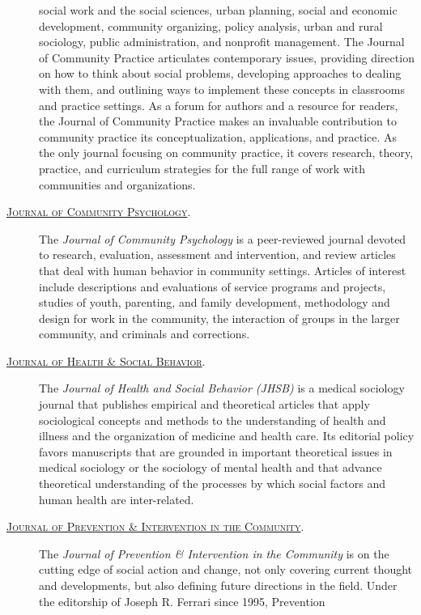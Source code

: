 \documentclass[]{tufte-handout}
\begin{document}
\begin{description}
social work and the social sciences, urban planning, social and economic
development, community organizing, policy analysis, urban and rural
sociology, public administration, and nonprofit management. The Journal
of Community Practice articulates contemporary issues, providing
direction on how to think about social problems, developing approaches
to dealing with them, and outlining ways to implement these concepts in
classrooms and practice settings. As a forum for authors and a resource
for readers, the Journal of Community Practice makes an invaluable
contribution to community practice its conceptualization, applications,
and practice. As the only journal focusing on community practice, it
covers research, theory, practice, and curriculum strategies for the
full range of work with communities and organizations.
\item[\href{http://onlinelibrary.wiley.com/journal/10.1002/(ISSN)1520-6629}{\textsc{Journal of Community Psychology}}.]
The \emph{Journal of Community Psychology} is a peer-reviewed journal
devoted to research, evaluation, assessment and intervention, and review
articles that deal with human behavior in community settings. Articles
of interest include descriptions and evaluations of service programs and
projects, studies of youth, parenting, and family development,
methodology and design for work in the community, the interaction of
groups in the larger community, and criminals and corrections.
\item[\href{http://hsb.sagepub.com/}{\textsc{Journal of Health \& Social Behavior}}.]
The \emph{Journal of Health and Social Behavior (JHSB)} is a medical
sociology journal that publishes empirical and theoretical articles that
apply sociological concepts and methods to the understanding of health
and illness and the organization of medicine and health care. Its
editorial policy favors manuscripts that are grounded in important
theoretical issues in medical sociology or the sociology of mental
health and that advance theoretical understanding of the processes by
which social factors and human health are inter-related.
\item[\href{http://www.tandfonline.com/action/journalInformation?journalCode=wpic20\#.U1p9ieZdXTM}{\textsc{Journal of Prevention \& Intervention in the Community}}.]
The \emph{Journal of Prevention \& Intervention in the Community} is on
the cutting edge of social action and change, not only covering current
thought and developments, but also defining future directions in the
field. Under the editorship of Joseph R. Ferrari since 1995, Prevention

\end{description}
\end{document}
